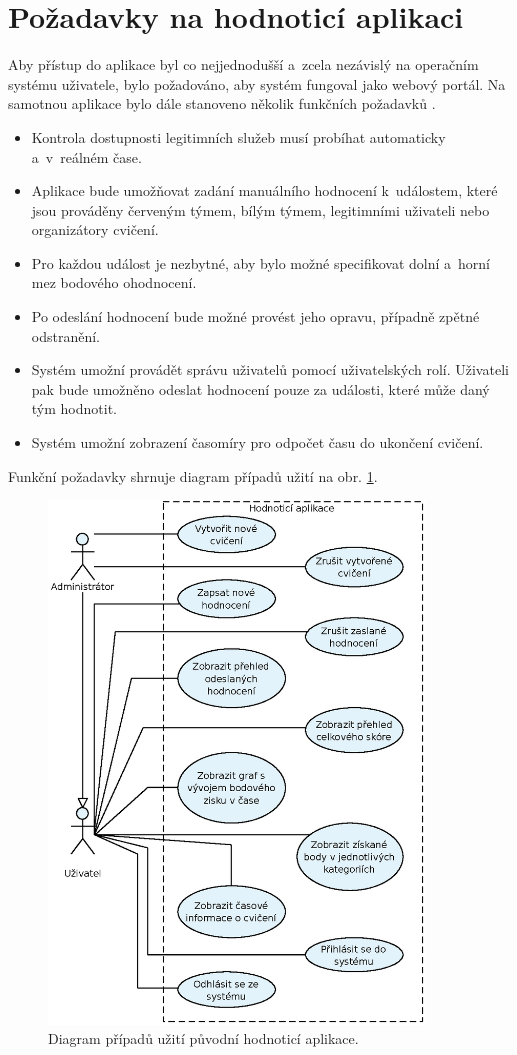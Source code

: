 \documentclass[
  digital,
  twoside,
  table, 
  nolof, 
  nolot
]{fithesis3}
\begin{document}
\section{Požadavky na hodnoticí aplikaci}

Aby přístup do aplikace byl co nejjednodušší a~zcela nezávislý na operačním systému uživatele, bylo požadováno, aby systém fungoval jako webový portál. Na samotnou aplikace bylo dále stanoveno několik funkčních požadavků \cite{Kostelnik2016thesis}.

\begin{itemize}
\item Kontrola dostupnosti legitimních služeb musí probíhat automaticky a~v~reálném čase.
\item Aplikace bude umožňovat zadání manuálního hodnocení k~událostem, které jsou prováděny červeným týmem, bílým týmem, legitimními uživateli nebo organizátory cvičení.
\item Pro každou událost je nezbytné, aby bylo možné specifikovat dolní a~horní mez bodového ohodnocení.
\item Po odeslání hodnocení bude možné provést jeho opravu, případně zpětné odstranění.
\item Systém umožní provádět správu uživatelů pomocí uživatelských rolí. Uživateli pak bude umožněno odeslat hodnocení pouze za události, které může daný tým hodnotit.
\item Systém umožní zobrazení časomíry pro odpočet času do ukončení cvičení.
\end{itemize}

Funkční požadavky shrnuje diagram případů užití na obr. \ref{fig:useCase1}.

\begin{figure}[ht!]
    \centering
    \includegraphics[width=10cm]{images/Use-case-1.eps}
    \caption{Diagram případů užití původní hodnoticí aplikace.}
    \label{fig:useCase1}
\end{figure}
\end{document}
